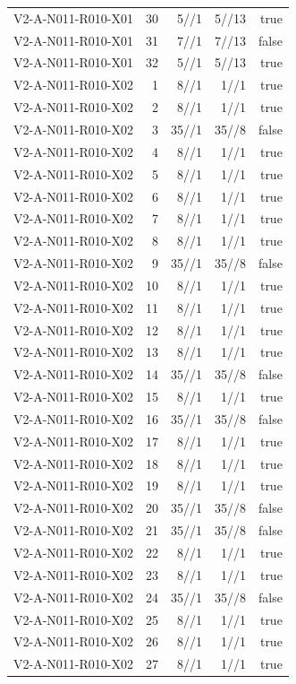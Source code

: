 {\begin{longtable}{lrrrr}
V2-A-N011-R010-X01 & 30 & 5//1 & 5//13 & true \\
V2-A-N011-R010-X01 & 31 & 7//1 & 7//13 & false \\
V2-A-N011-R010-X01 & 32 & 5//1 & 5//13 & true \\
V2-A-N011-R010-X02 & 1 & 8//1 & 1//1 & true \\
V2-A-N011-R010-X02 & 2 & 8//1 & 1//1 & true \\
V2-A-N011-R010-X02 & 3 & 35//1 & 35//8 & false \\
V2-A-N011-R010-X02 & 4 & 8//1 & 1//1 & true \\
V2-A-N011-R010-X02 & 5 & 8//1 & 1//1 & true \\
V2-A-N011-R010-X02 & 6 & 8//1 & 1//1 & true \\
V2-A-N011-R010-X02 & 7 & 8//1 & 1//1 & true \\
V2-A-N011-R010-X02 & 8 & 8//1 & 1//1 & true \\
V2-A-N011-R010-X02 & 9 & 35//1 & 35//8 & false \\
V2-A-N011-R010-X02 & 10 & 8//1 & 1//1 & true \\
V2-A-N011-R010-X02 & 11 & 8//1 & 1//1 & true \\
V2-A-N011-R010-X02 & 12 & 8//1 & 1//1 & true \\
V2-A-N011-R010-X02 & 13 & 8//1 & 1//1 & true \\
V2-A-N011-R010-X02 & 14 & 35//1 & 35//8 & false \\
V2-A-N011-R010-X02 & 15 & 8//1 & 1//1 & true \\
V2-A-N011-R010-X02 & 16 & 35//1 & 35//8 & false \\
V2-A-N011-R010-X02 & 17 & 8//1 & 1//1 & true \\
V2-A-N011-R010-X02 & 18 & 8//1 & 1//1 & true \\
V2-A-N011-R010-X02 & 19 & 8//1 & 1//1 & true \\
V2-A-N011-R010-X02 & 20 & 35//1 & 35//8 & false \\
V2-A-N011-R010-X02 & 21 & 35//1 & 35//8 & false \\
V2-A-N011-R010-X02 & 22 & 8//1 & 1//1 & true \\
V2-A-N011-R010-X02 & 23 & 8//1 & 1//1 & true \\
V2-A-N011-R010-X02 & 24 & 35//1 & 35//8 & false \\
V2-A-N011-R010-X02 & 25 & 8//1 & 1//1 & true \\
V2-A-N011-R010-X02 & 26 & 8//1 & 1//1 & true \\
V2-A-N011-R010-X02 & 27 & 8//1 & 1//1 & true \\

\end{longtable}}
